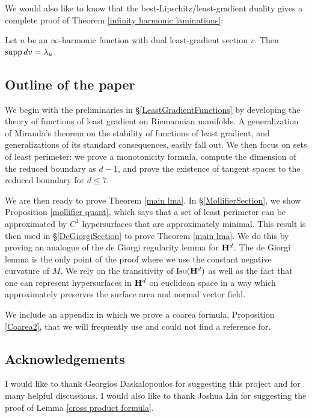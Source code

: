 We would also like to know that the best-Lipschitz/least-gradient duality gives a complete proof of Theorem \ref{infinity harmonic laminations}:

\begin{conjecture}
Let $u$ be an $\infty$-harmonic function with dual least-gradient section $v$.
Then $\operatorname{supp} dv = \lambda_u$.
\end{conjecture}


\subsection{Outline of the paper}
We begin with the preliminaries in \S\ref{LeastGradientFunctions} by developing the theory of functions of least gradient on Riemannian manifolds. A generalization of Miranda's theorem \cite[Teorema 3]{Miranda67} on the stability of functions of least gradient, and generalizations of its standard consequences, easily fall out.
We then focus on sets of least perimeter: we prove a monotonicity formula, compute the dimension of the reduced boundary as $d - 1$, and prove the existence of tangent spaces to the reduced boundary for $d \leq 7$.

We are then ready to prove Theorem \ref{main lma}.
In \S\ref{MollifierSection}, we show Proposition \ref{mollifier quant}, which says that a set of least perimeter can be approximated by $C^1$ hypersurfaces that are approximately minimal.
This result is then used in \S\ref{DeGiorgiSection} to prove Theorem \ref{main lma}. We do this by proving an analogue of the de Giorgi regularity lemma \cite[Teorema 5.7]{Miranda66} for $\mathbf H^d$. The de Giorgi lemma is the only point of the proof where we use the constant negative curvature of $M$.
We rely on the transitivity of $\operatorname{Iso}(\mathbf H^d)$ as well as the fact that one can represent hypersurfaces in $\mathbf H^d$ on euclidean space in a way which approximately preserves the surface area and normal vector field.

We include an appendix in which we prove a coarea formula, Proposition \ref{Coarea2}, that we will frequently use and could not find a reference for.


\subsection{Acknowledgements}
I would like to thank Georgios Daskalopoulos for suggesting this project and for many helpful discussions.
I would also like to thank Joshua Lin for suggesting the proof of Lemma \ref{cross product formula}.
